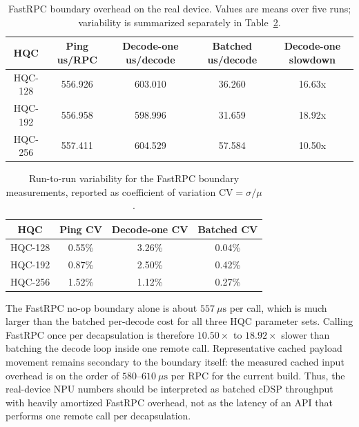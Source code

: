 \begin{table}[htbp]
\centering
\renewcommand{\arraystretch}{1.15}
\small

\begin{tabular}{|c|c|c|c|c|}
\hline
\textbf{HQC} & \textbf{Ping us/RPC} & \textbf{Decode-one us/decode} &
\textbf{Batched us/decode} & \textbf{Decode-one slowdown} \\
\hline
HQC-128 & 556.926 & 603.010 & 36.260 & 16.63x \\
\hline
HQC-192 & 556.958 & 598.996 & 31.659 & 18.92x \\
\hline
HQC-256 & 557.411 & 604.529 & 57.584 & 10.50x \\
\hline
\end{tabular}
\vspace{0.5em}
\caption{FastRPC boundary overhead on the real device. Values are means over five runs; variability is summarized separately in Table~\ref{tab:fastrpc-boundary-stability}.}
\label{tab:fastrpc-boundary-overhead}
\end{table}

\begin{table}[htbp]
\centering
\renewcommand{\arraystretch}{1.15}
\small
\begin{tabular}{|c|c|c|c|}
\hline
\textbf{HQC} & \textbf{Ping CV} & \textbf{Decode-one CV} &
\textbf{Batched CV} \\
\hline
HQC-128 & 0.55\% & 3.26\% & 0.04\% \\
\hline
HQC-192 & 0.87\% & 2.50\% & 0.42\% \\
\hline
HQC-256 & 1.52\% & 1.12\% & 0.27\% \\
\hline
\end{tabular}
\vspace{0.5em}
\caption{Run-to-run variability for the FastRPC boundary measurements, reported as coefficient of variation \(\mathrm{CV}=\sigma/\mu\).}
\label{tab:fastrpc-boundary-stability}
\end{table}

The FastRPC no-op boundary alone is about \(557\ \mu\mathrm{s}\) per call, which
is much larger than the batched per-decode cost for all three HQC parameter
sets. Calling FastRPC once per decapsulation is therefore \(10.50\times\) to
\(18.92\times\) slower than batching the decode loop inside one remote call.
Representative cached payload movement remains secondary to the boundary
itself: the measured cached input overhead is on the order of \(580\)--\(610\ \mu\mathrm{s}\)
per RPC for the current build. Thus, the real-device NPU numbers
should be interpreted as batched cDSP throughput with heavily amortized FastRPC
overhead, not as the latency of an API that performs one remote call per
decapsulation.
    
